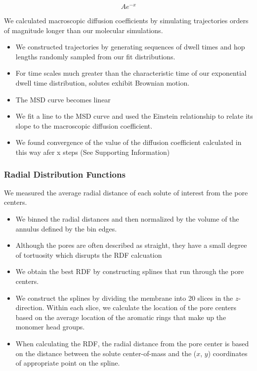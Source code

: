 \documentclass{article}
\begin{document}
  \begin{equation}
	Ae^{-x}
  \end{equation}

  We calculated macroscopic diffusion coefficients by simulating trajectories orders of
  magnitude longer than our molecular simulations. 
  \begin{itemize}
	\item We constructed trajectories by generating sequences of dwell times 
        and hop lengths randomly sampled from our fit distributions.
	\item For time scales much greater than the characteristic time of our
	exponential dwell time distribution, solutes exhibit Brownian motion. 
	\item The MSD curve becomes linear
	\item We fit a line to the MSD curve and used the Einstein relationship
	to relate its slope to the macroscopic diffusion coefficient.
	\item We found convergence of the value of the diffusion coefficient 
	calculated in this way afer x steps (See Supporting Information)
  \end{itemize}

  \subsubsection*{Radial Distribution Functions}

  We measured the average radial distance of each solute of interest from the pore
  centers.
  \begin{itemize}
	\item We binned the radial distances and then normalized by the volume
	of the annulus defined by the bin edges.
	\item Although the pores are often described as straight, they have a
	small degree of tortuosity which disrupts the RDF calcuation 
	\item We obtain the best RDF by constructing splines that run through the
	pore centers.
	\item We construct the splines by dividing the membrane into 20 slices
	in the $z$-direction. Within each slice, we calculate the location of 
	the pore centers based on the average location of the aromatic rings
	that make up the monomer head groups.
	\item When calculating the RDF, the radial distance from the pore center
	is based on the distance between the solute center-of-mass and the ($x$, $y$)
	coordinates of appropriate point on the spline.
  \end{itemize}
\end{document}
